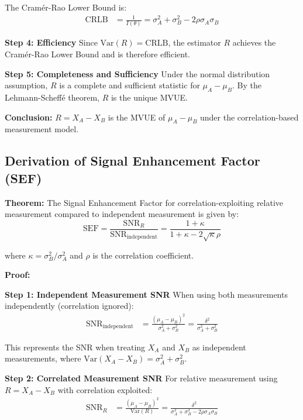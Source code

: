 The Cramér-Rao Lower Bound is:
\begin{align}
\text{CRLB} &= \frac{1}{I(\theta)} = \sigma_A^2 + \sigma_B^2 - 2\rho\sigma_A\sigma_B
\end{align}

\textbf{Step 4: Efficiency}
Since $\text{Var}(R) = \text{CRLB}$, the estimator $R$ achieves the Cramér-Rao Lower Bound and is therefore efficient.

\textbf{Step 5: Completeness and Sufficiency}
Under the normal distribution assumption, $R$ is a complete and sufficient statistic for $\mu_A - \mu_B$. By the Lehmann-Scheffé theorem, $R$ is the unique MVUE.

\textbf{Conclusion:} $R = X_A - X_B$ is the MVUE of $\mu_A - \mu_B$ under the correlation-based measurement model.

\subsection{Derivation of Signal Enhancement Factor (SEF)}

\textbf{Theorem:} The Signal Enhancement Factor for correlation-exploiting relative measurement compared to independent measurement is given by:
\begin{equation}
\text{SEF} = \frac{\text{SNR}_R}{\text{SNR}_{\text{independent}}} = \frac{1 + \kappa}{1 + \kappa - 2\sqrt{\kappa}\rho}
\end{equation}

where $\kappa = \sigma_B^2/\sigma_A^2$ and $\rho$ is the correlation coefficient.

\textbf{Proof:}

\textbf{Step 1: Independent Measurement SNR}
When using both measurements independently (correlation ignored):
\begin{align}
\text{SNR}_{\text{independent}} &= \frac{(\mu_A - \mu_B)^2}{\sigma_A^2 + \sigma_B^2} = \frac{\delta^2}{\sigma_A^2 + \sigma_B^2}
\end{align}

This represents the SNR when treating $X_A$ and $X_B$ as independent measurements, where $\text{Var}(X_A - X_B) = \sigma_A^2 + \sigma_B^2$.

\textbf{Step 2: Correlated Measurement SNR}
For relative measurement using $R = X_A - X_B$ with correlation exploited:
\begin{align}
\text{SNR}_R &= \frac{(\mu_A - \mu_B)^2}{\text{Var}(R)} = \frac{\delta^2}{\sigma_A^2 + \sigma_B^2 - 2\rho\sigma_A\sigma_B}
\end{align}

